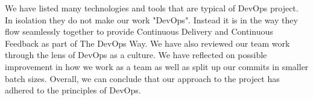 \documentclass{article}
\begin{document}
We have listed many technologies and tools that are typical of DevOps project. In isolation they do not make our work "DevOps". Instead it is in the way they flow seamlessly together to provide Continuous Delivery and Continuous Feedback as part of The DevOps Way. We have also reviewed our team work through the lens of DevOps as a culture. We have reflected on possible improvement in how we work as a team as well as split up our commits in smaller batch sizes. Overall, we can conclude that our approach to the project has adhered to the principles of DevOps. 



\end{document}

